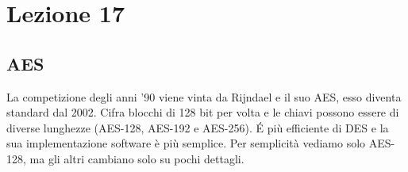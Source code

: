\section*{Lezione 17}

\subsection*{AES}

La competizione degli anni '90 viene vinta da Rijndael e il suo AES, esso diventa standard dal 2002. Cifra blocchi di 128 bit per volta e le chiavi possono essere di diverse lunghezze (AES-128, AES-192 e AES-256). \'E più efficiente di DES e la sua implementazione software è più semplice.
Per semplicità vediamo solo AES-128, ma gli altri cambiano solo su pochi dettagli.
